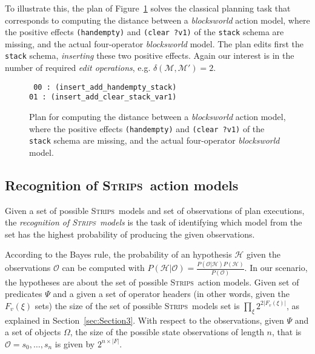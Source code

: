 \documentclass[3p,times]{elsarticle}
\newcommand{\strips}{\textsc{Strips}}     %
\begin{document}
To illustrate this, the plan of Figure~\ref{fig:plan-mdistance} solves the classical planning task that corresponds to computing the distance between a \emph{blocksworld} action model, where the positive effects {\tt\small (handempty)} and {\tt\small (clear ?v1)} of the {\tt\small stack} schema are missing, and the actual four-operator {\em blocksworld} model. The plan edits first the {\tt\small stack} schema, {\em inserting} these two positive effects. Again our interest is in the number of required {\em edit operations}, e.g. $\delta(\mathcal{M},\mathcal{M'})=2$. 


\begin{figure}[hbt!]
{\tt\small
00 : (insert\_add\_handempty\_stack)\\
01 : (insert\_add\_clear\_stack\_var1)
}
 \caption{\small Plan for computing the distance between a \emph{blocksworld} action model, where the positive effects {\tt\small (handempty)} and {\tt\small (clear ?v1)} of the {\tt\small stack} schema are missing, and the actual four-operator {\em blocksworld} model.}
\label{fig:plan-mdistance}
\end{figure}

\subsection{Recognition of \strips\ action models}
Given a set of possible \strips\ models and set of observations of plan executions, the {\em recognition of \strips\ models} is the task of identifying which model from the set has the highest probability of producing the given observations.

According to the Bayes rule, the probability of an hypothesis $\mathcal{H}$ given the observations $\mathcal{O}$ can be computed with $P(\mathcal{H}|\mathcal{O})=\frac{P(\mathcal{O}|\mathcal{H})P(\mathcal{H})}{P(\mathcal{O})}$. In our scenario, the hypotheses are about the set of possible \strips\ action models. Given set of predicates $\Psi$ and a given a set of operator headers (in other words, given the $F_v(\xi)$ sets) the size of the set of possible \strips\ models set is $\prod_\xi 2^{2|F_v(\xi)|}$, as explained in Section~\ref{sec:Section3}. With respect to the observations, given $\Psi$ and a set of objects $\Omega$, the size of the possible state observations of length $n$, that is $\mathcal{O}=s_0,\ldots,s_n$ is given by $2^{n\times|F|}$.
\end{document}
